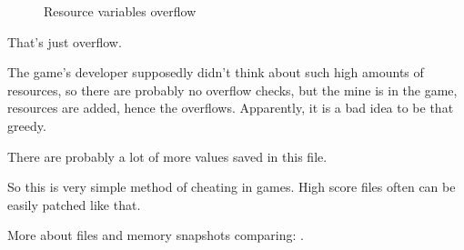 \begin{figure}[H]
\centering
{}
\caption{Resource variables overflow}
\label{fig:mill_8}
\end{figure}

That's just overflow. 

The game's developer supposedly didn't think about such high amounts of resources,
so there are probably no overflow checks, but the mine is  in the game, resources are added,
hence the overflows.
Apparently, it is a bad idea to be that greedy.

There are probably a lot of more values 
saved in this file.

So this is very simple method of cheating in games.
High score files often can be easily 
patched like that.

More about files and memory snapshots comparing: 
.
